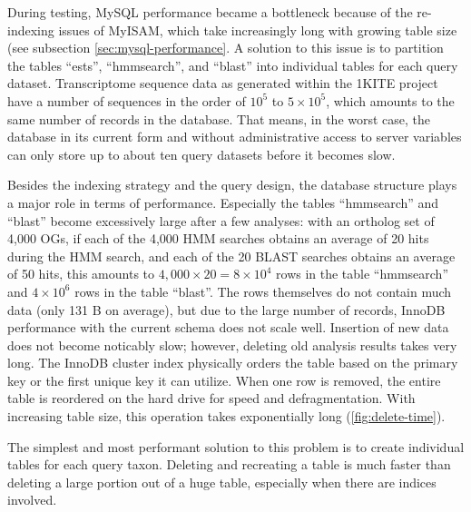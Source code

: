 \label{sec:mysql-performance-discussion}
During testing, MySQL performance became a bottleneck because of the re-indexing
issues of MyISAM, which take increasingly long with growing table size
(see subsection \autoref{sec:mysql-performance}. A solution to this issue is to
partition the tables ``ests'', ``hmmsearch'', and ``blast'' into individual
tables for each query dataset. Transcriptome sequence data as generated within
the 1KITE project have a number of sequences in the order of $10^5$ to
$5\times10^5$, which amounts to the same number of records in the database. That
means, in the worst case, the database in its current form and without
administrative access to server variables can only store up to about ten query
datasets before it becomes slow.

Besides the indexing strategy and the query design, the database structure plays
a major role in terms of performance. Especially the tables ``hmmsearch'' and
``blast'' become excessively large after a few analyses: with an ortholog set of
4,000 OGs, if each of the 4,000 HMM searches obtains an average of 20 hits
during the HMM search, and each of the 20 BLAST searches obtains an average of
50 hits, this amounts to $4,000 \times 20 = 8 \times 10^4$ rows in the table
``hmmsearch'' and $4 \times 10^6$ rows in the table ``blast''.  The rows
themselves do not contain much data (only 131 B on average), but due to the
large number of records, InnoDB performance with the current schema does not
scale well. Insertion of new data does not become noticably slow; however,
deleting old analysis results takes very long. The InnoDB cluster index
physically orders the table based on the primary key or the first unique key it
can utilize. When one row is removed, the entire table is reordered on the hard
drive for speed and defragmentation. With increasing table size, this operation
takes exponentially long (\autoref{fig:delete-time}).

The simplest and most performant solution to this problem is to create
individual tables for each query taxon. Deleting and recreating a table is much
faster than deleting a large portion out of a huge table, especially when there
are indices involved. 


